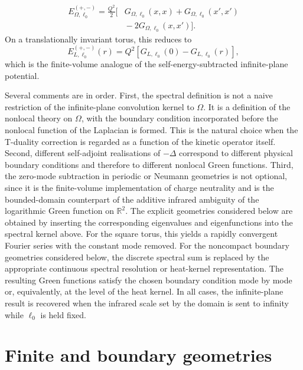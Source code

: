 \documentclass[openacc]{rsproca_new}%
\begin{document}
\begin{equation}
\begin{split}
  E_{\Omega,\ell_0}^{(+,-)}=\frac{Q^2}{2}\big[&
  G_{\Omega,\ell_0}(x,x)+G_{\Omega,\ell_0}(x',x')\\
  &{}-2G_{\Omega,\ell_0}(x,x')\big].
\end{split}
\end{equation}
On a translationally invariant torus, this reduces to
\begin{equation}
  E_{L,\ell_0}^{(+,-)}(r)=
  Q^2\left[G_{L,\ell_0}(0)-G_{L,\ell_0}(r)\right],
\end{equation}
which is the finite-volume analogue of the self-energy-subtracted infinite-plane potential.

Several comments are in order. First, the spectral definition is not a naive restriction of the infinite-plane convolution kernel to $\Omega$. It is a definition of the nonlocal theory on $\Omega$, with the boundary condition incorporated before the nonlocal function of the Laplacian is formed. This is the natural choice when the T-duality correction is regarded as a function of the kinetic operator itself. Second, different self-adjoint realisations of $-\Delta$ correspond to different physical boundary conditions and therefore to different nonlocal Green functions. Third, the zero-mode subtraction in periodic or Neumann geometries is not optional, since it is the finite-volume implementation of charge neutrality and is the bounded-domain counterpart of the additive infrared ambiguity of the logarithmic Green function on $\mathbb R^2$. The explicit geometries considered below are obtained by inserting the corresponding eigenvalues and eigenfunctions into the spectral kernel above. For the square torus, this yields a rapidly convergent Fourier series with the constant mode removed. For the noncompact boundary geometries considered below, the discrete spectral sum is replaced by the appropriate continuous spectral resolution or heat-kernel representation. The resulting Green functions satisfy the chosen boundary condition mode by mode or, equivalently, at the level of the heat kernel. In all cases, the infinite-plane result is recovered when the infrared scale set by the domain is sent to infinity while $\ell_0$ is held fixed.


\section{Finite and boundary geometries}\label{sec:finite_boundary_examples}
\end{document}
